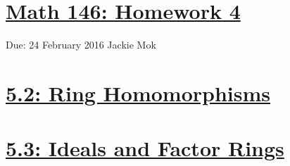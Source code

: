 \documentclass{article}
\begin{document}
\section*{\underline{Math 146: Homework 4}}
Due: 24 February 2016
\newline Jackie Mok

\vspace{10 mm}

\section*{\underline{5.2: Ring Homomorphisms}}





\section*{\underline{5.3: Ideals and Factor Rings}}






\end{document}
